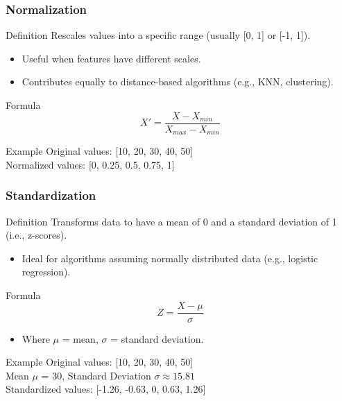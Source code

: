 \documentclass{beamer}
\begin{document}
\begin{frame}[fragile]
    \frametitle{Normalization}
    \begin{block}{Definition}
        Rescales values into a specific range (usually [0, 1] or [-1, 1]).
    \end{block}
    
    \begin{itemize}
        \item Useful when features have different scales.
        \item Contributes equally to distance-based algorithms (e.g., KNN, clustering).
    \end{itemize}
    
    \begin{block}{Formula}
        \begin{equation}
            X' = \frac{X - X_{min}}{X_{max} - X_{min}}
        \end{equation}
    \end{block}
    
    \begin{block}{Example}
        Original values: [10, 20, 30, 40, 50] \\
        Normalized values: [0, 0.25, 0.5, 0.75, 1]
    \end{block}
\end{frame}

\begin{frame}[fragile]
    \frametitle{Standardization}
    \begin{block}{Definition}
        Transforms data to have a mean of 0 and a standard deviation of 1 (i.e., z-scores).
    \end{block}
    
    \begin{itemize}
        \item Ideal for algorithms assuming normally distributed data (e.g., logistic regression).
    \end{itemize}
    
    \begin{block}{Formula}
        \begin{equation}
            Z = \frac{X - \mu}{\sigma}
        \end{equation}
    \end{block}
    
    \begin{itemize}
        \item Where $\mu$ = mean, $\sigma$ = standard deviation.
    \end{itemize}
    
    \begin{block}{Example}
        Original values: [10, 20, 30, 40, 50] \\
        Mean $\mu$ = 30, Standard Deviation $\sigma \approx 15.81$ \\
        Standardized values: [-1.26, -0.63, 0, 0.63, 1.26]
    \end{block}
\end{frame}
\end{document}
